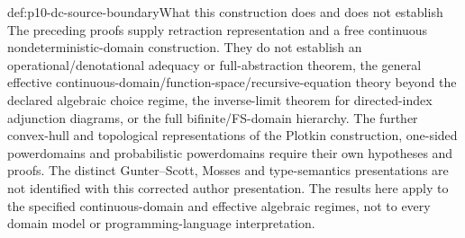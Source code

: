 \begin{proofboundary}{def:p10-dc-source-boundary}{What this construction does and does not establish}
The preceding proofs supply retraction representation and a free
continuous nondeterministic-domain construction. They do not establish
an operational/denotational adequacy or full-abstraction theorem,
the general effective continuous-domain/function-space/recursive-equation
theory beyond the declared algebraic choice regime, the inverse-limit theorem for directed-index
adjunction diagrams, or the full bifinite/FS-domain hierarchy.
The further convex-hull and topological representations of the Plotkin
construction, one-sided powerdomains and probabilistic powerdomains
require their own hypotheses and proofs.
The distinct Gunter--Scott, Mosses and type-semantics presentations are
not identified with this corrected author presentation. The results here
apply to the specified continuous-domain and effective algebraic regimes,
not to every domain model or programming-language interpretation.
\end{proofboundary}
